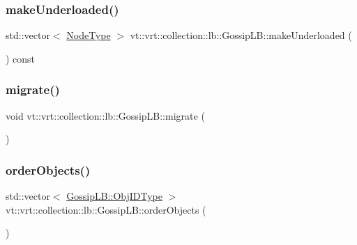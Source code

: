 \subsubsection{\texorpdfstring{make\+Underloaded()}{makeUnderloaded()}}
{\footnotesize\ttfamily std\+::vector$<$ \hyperlink{namespacevt_a866da9d0efc19c0a1ce79e9e492f47e2}{Node\+Type} $>$ vt\+::vrt\+::collection\+::lb\+::\+Gossip\+L\+B\+::make\+Underloaded (\begin{DoxyParamCaption}{ }\end{DoxyParamCaption}) const\hspace{0.3cm}{\ttfamily [protected]}}

\mbox{\label{structvt_1_1vrt_1_1collection_1_1lb_1_1_gossip_l_b_ab4ea54ee62ebad9105d79ece61f41b50}} 
\subsubsection{\texorpdfstring{migrate()}{migrate()}}
{\footnotesize\ttfamily void vt\+::vrt\+::collection\+::lb\+::\+Gossip\+L\+B\+::migrate (\begin{DoxyParamCaption}{ }\end{DoxyParamCaption})\hspace{0.3cm}{\ttfamily [protected]}}

\mbox{\label{structvt_1_1vrt_1_1collection_1_1lb_1_1_gossip_l_b_a82ff444a270a4b8f0bb9ff72e7244c58}} 
\subsubsection{\texorpdfstring{order\+Objects()}{orderObjects()}}
{\footnotesize\ttfamily std\+::vector$<$ \hyperlink{structvt_1_1vrt_1_1collection_1_1lb_1_1_base_l_b_a790b22acf448880599724749cdc4e9b3}{Gossip\+L\+B\+::\+Obj\+I\+D\+Type} $>$ vt\+::vrt\+::collection\+::lb\+::\+Gossip\+L\+B\+::order\+Objects (\begin{DoxyParamCaption}{ }\end{DoxyParamCaption})\hspace{0.3cm}{\ttfamily [protected]}}

